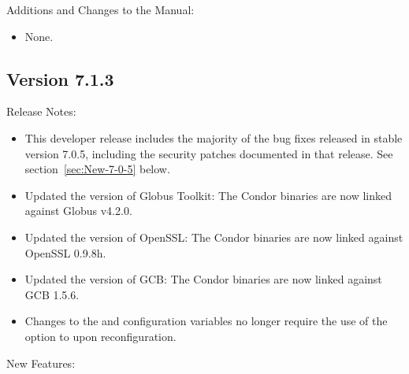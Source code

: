 \noindent Additions and Changes to the Manual:

\begin{itemize}

\item None.

\end{itemize}



\subsection*{\label{sec:New-7-1-3}Version 7.1.3}

\noindent Release Notes:

\begin{itemize}

\item This developer release includes the majority of the bug fixes released
	in stable version 7.0.5, including the security patches documented in that
	release.  See section~\ref{sec:New-7-0-5} below.

\item Updated the version of Globus Toolkit: The Condor binaries are now
	linked against Globus v4.2.0.

\item Updated the version of OpenSSL: The Condor binaries are now linked
	against OpenSSL 0.9.8h.

\item Updated the version of GCB: The Condor binaries are now linked
	against GCB 1.5.6.

\item Changes to the  and  configuration
	variables no longer require the use of the  option to
	 upon reconfiguration.

\end{itemize}

\noindent New Features:

